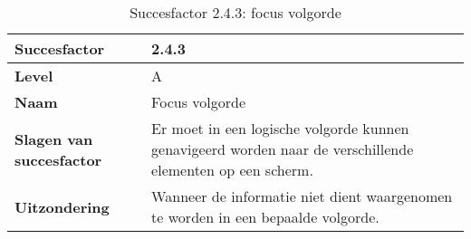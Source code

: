\begin{table}[H]
    \centering
    \caption{Succesfactor 2.4.3: focus volgorde}
    
    
    \hspace*{-1cm}\begin{tabular}{|l|p{12cm}|} 
        \hline
        \textbf{Succesfactor}                 & 2.4.3                                                                                                                                                                                                                                                                                                                                                                                                                                                                                                          \\ 
        \hline
        \textbf{Level}                        & A                                                                                                                                                                                                                                                                                                                                                                                                                                                                                                                 \\ 
        \hline
        \textbf{Naam}                         & Focus volgorde~                                                                                                                                                                                                                                                                                                                                                                                                                                                                                      \\ 
        \hline
        \textbf{Slagen van succesfactor}      & Er moet in een logische volgorde kunnen genavigeerd worden naar de verschillende elementen op een scherm.                                                            \\ 
                \hline
        \textbf{Uitzondering}     & 
        Wanneer de informatie niet dient waargenomen te worden in een bepaalde volgorde.                                                                                                                                                                                                    \\ 
        

\end{tabular}
\end{table}
